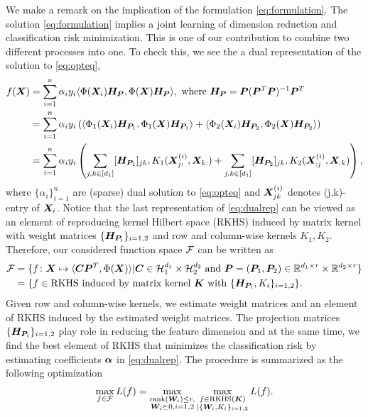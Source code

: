 \documentclass[12pt]{article}
\begin{document}
We make a remark on the implication of the formulation \eqref{eq:formulation}.
The solution \eqref{eq:formulation} implies a joint learning of dimension reduction and classification risk minimization. This is one of our contribution to combine two different processes into one. To check this, we see the a dual representation of the solution to \eqref{eq:opteq},
\begin{align}\label{eq:dualrep}
f(\bm X) &= \sum_{i=1}^n \alpha_i y_i\langle \Phi(\bm X_i)\bm{H}_{\bm{P}} ,\Phi(\bm X)\bm{H}_{\bm{P}}  \rangle,\text{ where } \bm{H}_{\bm{P}} = \bm{P}(\bm{P}^T\bm{P})^{-1}\bm{P}^T\\
&=\sum_{i=1}^n\alpha_iy_i\left(\langle \Phi_1(\bm X_i)\bm{H}_{\bm{P}_1},\Phi_1(\bm X)\bm{H}_{\bm{P}_1}\rangle+\langle \Phi_2(\bm X_i)\bm{H}_{\bm{P}_2},\Phi_2(\bm X)\bm{H}_{\bm{P}_2}\rangle\right)\\
&= \sum_{i=1}^n\alpha_iy_i\left(\sum_{j,k\in[d_1]} [\bm{H}_{\bm{P}_1}]_{jk},K_1(\bm X^{(i)}_{j:},\bm X_{k:})+\sum_{j,k\in[d_1]} [\bm{H}_{\bm{P}_2}]_{jk},K_2(\bm X^{(i)}_{:j},\bm X_{:k})\right),
\end{align}
where $\{\alpha_i\}_{i=1}^n$ are  (sparse) dual solution to \eqref{eq:opteq} and $\bm X^{(i)}_{jk}$ denotes (j,k)-entry of $\bm X_i$. Notice that the last representation of \eqref{eq:dualrep} can be viewed as an element of reproducing kernel Hilbert space (RKHS) induced by matrix kernel with weight matrices $\{\bm{H}_{\bm{P}_i}\}_{i=1,2}$ and row and column-wise kernels $K_1,K_2$.
Therefore, our considered function space $\mathcal{F}$ can be written as 
\begin{align}
    \mathcal{F} &= \{f\colon\bm X\mapsto\langle\bm C\bm{P}^T,\Phi(\bm X)\rangle|\bm C\in\mathcal{H}_1^{d_1}\times \mathcal{H}_2^{d_2} \text{ and }\bm{P} = (\bm{P}_1,\bm{P}_2)\in\mathbb{R}^{d_1\times r} \times \mathbb{R}^{d_2\times r}\}\\
    &=\{f\in \text{RKHS induced by matrix kernel } \bm K \text{ with } \{\bm{H}_{\bm{P}_i},K_i\}_{i=1,2}\}.
\end{align}
Given row and column-wise kernels, we estimate weight matrices and an element of RKHS induced by the estimated weight matrices.
The projection matrices $\{\bm{H}_{\bm{P}_i}\}_{i=1,2}$ play role in reducing  the feature dimension and at the same time, we find the best element of RKHS that minimizes the classification risk by estimating coefficients $\bm\alpha$ in \eqref{eq:dualrep}. The procedure is summarized as the following optimization
\begin{align}
    \max_{f\in\mathcal{F}}L(f)  = \max_{\substack{\text{rank}(\bm{W}_i)\leq r,\\ \bm{W}_i\succeq 0,i = 1,2}}\max_{\substack{f\in\text{RKHS} (\bm K)\\ |\{\bm{W}_i,K_i\}_{i=1,2}}}L(f).
\end{align}
\end{document}
